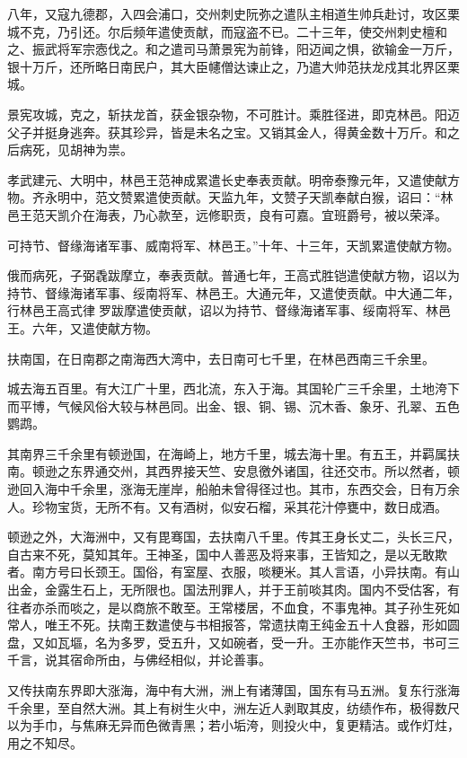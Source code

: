 \documentclass[12pt,UTF8]{ctexbook}
\begin{document}
八年，又寇九德郡，入四会浦口，交州刺史阮弥之遣队主相道生帅兵赴讨，攻区栗城不克，乃引还。尔后频年遣使贡献，而寇盗不已。二十三年，使交州刺史檀和之、振武将军宗悫伐之。和之遣司马萧景宪为前锋，阳迈闻之惧，欲输金一万斤，银十万斤，还所略日南民户，其大臣幰僧达谏止之，乃遣大帅范扶龙戍其北界区栗城。

景宪攻城，克之，斩扶龙首，获金银杂物，不可胜计。乘胜径进，即克林邑。阳迈父子并挺身逃奔。获其珍异，皆是未名之宝。又销其金人，得黄金数十万斤。和之后病死，见胡神为祟。

孝武建元、大明中，林邑王范神成累遣长史奉表贡献。明帝泰豫元年，又遣使献方物。齐永明中，范文赞累遣使贡献。天监九年，文赞子天凯奉献白猴，诏曰：“林邑王范天凯介在海表，乃心款至，远修职贡，良有可嘉。宜班爵号，被以荣泽。

可持节、督缘海诸军事、威南将军、林邑王。”十年、十三年，天凯累遣使献方物。

俄而病死，子弼毳跋摩立，奉表贡献。普通七年，王高式胜铠遣使献方物，诏以为持节、督缘海诸军事、绥南将军、林邑王。大通元年，又遣使贡献。中大通二年，行林邑王高式律罗跋摩遣使贡献，诏以为持节、督缘海诸军事、绥南将军、林邑王。六年，又遣使献方物。

扶南国，在日南郡之南海西大湾中，去日南可七千里，在林邑西南三千余里。

城去海五百里。有大江广十里，西北流，东入于海。其国轮广三千余里，土地洿下而平博，气候风俗大较与林邑同。出金、银、铜、锡、沉木香、象牙、孔翠、五色鹦鹉。

其南界三千余里有顿逊国，在海崎上，地方千里，城去海十里。有五王，并羁属扶南。顿逊之东界通交州，其西界接天竺、安息徼外诸国，往还交市。所以然者，顿逊回入海中千余里，涨海无崖岸，船舶未曾得径过也。其市，东西交会，日有万余人。珍物宝货，无所不有。又有酒树，似安石榴，采其花汁停甕中，数日成酒。

顿逊之外，大海洲中，又有毘骞国，去扶南八千里。传其王身长丈二，头长三尺，自古来不死，莫知其年。王神圣，国中人善恶及将来事，王皆知之，是以无敢欺者。南方号曰长颈王。国俗，有室屋、衣服，啖粳米。其人言语，小异扶南。有山出金，金露生石上，无所限也。国法刑罪人，并于王前啖其肉。国内不受估客，有往者亦杀而啖之，是以商旅不敢至。王常楼居，不血食，不事鬼神。其子孙生死如常人，唯王不死。扶南王数遣使与书相报答，常遗扶南王纯金五十人食器，形如圆盘，又如瓦塸，名为多罗，受五升，又如碗者，受一升。王亦能作天竺书，书可三千言，说其宿命所由，与佛经相似，并论善事。

又传扶南东界即大涨海，海中有大洲，洲上有诸薄国，国东有马五洲。复东行涨海千余里，至自然大洲。其上有树生火中，洲左近人剥取其皮，纺绩作布，极得数尺以为手巾，与焦麻无异而色微青黑；若小垢洿，则投火中，复更精洁。或作灯炷，用之不知尽。
\end{document}
